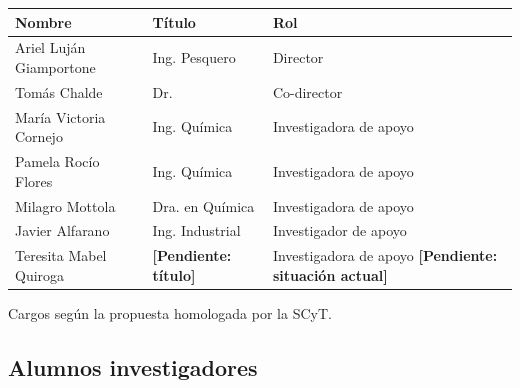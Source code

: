 \documentclass[12pt, a4paper]{article}
\newcommand{\pend}[1]{\textcolor{red!70!black}{\textbf{[Pendiente: #1]}}}
\begin{document}
\begin{longtable}{p{5.5cm}p{4cm}p{4cm}}
\toprule
\textbf{Nombre} & \textbf{Título} & \textbf{Rol} \\
\midrule
Ariel Luján Giamportone & Ing. Pesquero & Director \\
Tomás Chalde & Dr. & Co-director \\
María Victoria Cornejo & Ing. Química & Investigadora de apoyo \\
Pamela Rocío Flores & Ing. Química & Investigadora de apoyo \\
Milagro Mottola & Dra. en Química & Investigadora de apoyo \\
Javier Alfarano & Ing. Industrial & Investigador de apoyo \\
Teresita Mabel Quiroga & \pend{título} & Investigadora de apoyo \pend{situación actual} \\
\bottomrule
\end{longtable}

{\footnotesize Cargos según la propuesta homologada por la SCyT.}

\subsection{Alumnos investigadores}
\end{document}
